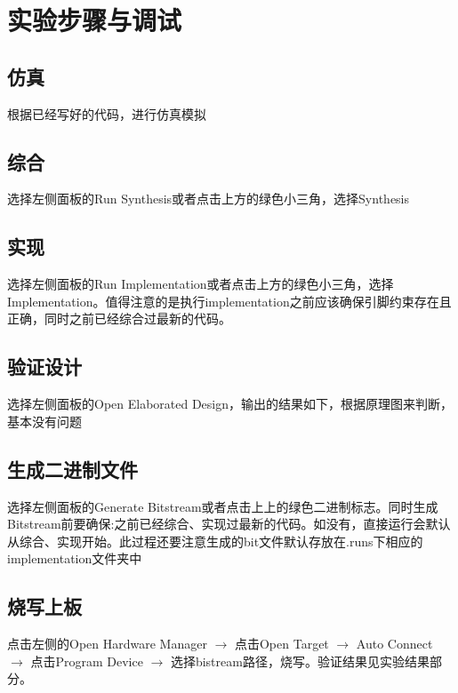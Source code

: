 
\section{实验步骤与调试}
\subsection{仿真} 根据已经写好的代码，进行仿真模拟\\
\subsection{综合} 选择左侧面板的Run Synthesis或者点击上方的绿色小三角，选择Synthesis
\subsection{实现} 选择左侧面板的Run Implementation或者点击上方的绿色小三角，选择Implementation。值得注意的是执行implementation之前应该确保引脚约束存在且正确，同时之前已经综合过最新的代码。
\subsection{验证设计} 选择左侧面板的Open Elaborated Design，输出的结果如下，根据原理图来判断，基本没有问题
\subsection{生成二进制文件} 选择左侧面板的Generate Bitstream或者点击上上的绿色二进制标志。同时生成Bitstream前要确保:之前已经综合、实现过最新的代码。如没有，直接运行会默认从综合、实现开始。此过程还要注意生成的bit文件默认存放在.runs下相应的implementation文件夹中
\subsection{烧写上板} 点击左侧的Open Hardware Manager $\rightarrow$ 点击Open Target $\rightarrow$ Auto Connect $\rightarrow$ 点击Program Device $\rightarrow$ 选择bistream路径，烧写。验证结果见实验结果部分。
